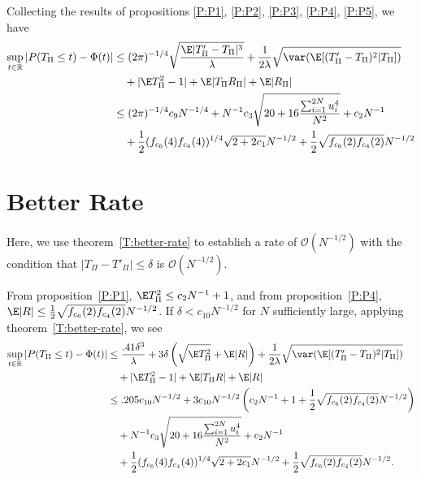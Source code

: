 Collecting the results of propositions \ref{P:P1}, \ref{P:P2}, \ref{P:P3},
\ref{P:P4}, \ref{P:P5}, we have
\begin{equation*}
  \begin{split}
    \sup_{t \in \mathbb{R}} |P(T_{\Pi} \leq t) - \Phi(t)|
    &\leq (2\pi)^{-1/4} \sqrt{\frac{\E |T_{\Pi}'-T_{\Pi}|^3}{\lambda}}
    + \frac{1}{2\lambda} \sqrt{\var (\E [(T_{\Pi}'-T_{\Pi})^2|T_{\Pi}])} \\
    &\quad + |\E T_{\Pi}^2 - 1| + \E |T_{\Pi}R_{\Pi}| + \E |R_{\Pi}| \\
    &\leq  (2\pi)^{-1/4} c_9 N^{-1/4} +
    N^{-1} c_3\sqrt{20 + 16\frac{\sum_{i=1}^{2N} u_{i}^4}{N^2}} + c_2 N^{-1} \\
    &\quad + \frac{1}{2}(f_{c_6}(4)f_{c_4}(4))^{1/4} \sqrt{2+2c_1} N^{-1/2} +
    \frac{1}{2}\sqrt{f_{c_6}(2)f_{c_4}(2)} N^{-1/2}
  \end{split}
\end{equation*}

\section{Better Rate}
Here, we use theorem~\ref{T:better-rate} to establish a rate of
$\mathcal{O}(N^{-1/2})$ with the condition that $|T_{\Pi}-T'_{\Pi}| \leq \delta$
is $\mathcal{O}(N^{-1/2})$.

From proposition~\ref{P:P1}, $\E T_{\Pi}^2 \leq c_2 N^{-1} + 1$, and
from proposition~\ref{P:P4}, $\E|R| \leq
\frac{1}{2}\sqrt{f_{c_6}(2)f_{c_4}(2)} N^{-1/2}$.
If $\delta < c_{10}N^{-1/2}$ for $N$ sufficiently large, applying
theorem~\ref{T:better-rate}, we see
\begin{equation*}
  \begin{split}
    \sup_{t \in \mathbb{R}} |P(T_{\Pi} \leq t) - \Phi(t)|
    &\leq \frac{.41 \delta^3}{\lambda} + 3 \delta \left ( \sqrt{\E T_{\Pi}^2} + \E |R| \right )
    + \frac{1}{2\lambda} \sqrt{\var (\E [(T_{\Pi}'-T_{\Pi})^2|T_{\Pi}])} \\
    &\quad + |\E T_{\Pi}^2 - 1| + \E |T_{\Pi} R| + \E |R| \\
    &\leq .205 c_{10} N^{-1/2} + 3c_{10} N^{-1/2} \left (
      c_2 N^{-1} + 1 + \frac{1}{2}\sqrt{f_{c_6}(2)f_{c_4}(2)} N^{-1/2}
      \right ) \\
    &\quad + N^{-1} c_3\sqrt{20 + 16\frac{\sum_{i=1}^{2N} u_{i}^4}{N^2}} + c_2 N^{-1} \\
    &\quad + \frac{1}{2}(f_{c_6}(4)f_{c_4}(4))^{1/4} \sqrt{2+2c_1} N^{-1/2} +
    \frac{1}{2}\sqrt{f_{c_6}(2)f_{c_4}(2)} N^{-1/2}.
  \end{split}
\end{equation*}

